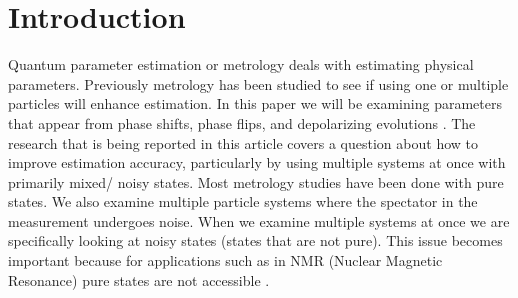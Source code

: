 \documentclass[twocolumn]{article}
\begin{document}
\section*{Introduction}
Quantum parameter estimation or metrology deals with estimating physical parameters. Previously metrology has been studied to see if using one or multiple particles will enhance estimation. In this paper we will be examining parameters that appear from phase shifts, phase flips, and depolarizing evolutions \cite{Braunstein,Caves,Helstrom,Sarovar}. The research that is being reported in this article covers a question about how to improve estimation accuracy, particularly by using multiple systems at once with primarily mixed/ noisy states. Most metrology studies have been done with pure states. We also examine multiple particle systems where the spectator in the measurement undergoes noise. When we examine multiple systems at once we are specifically looking at noisy states (states that are not pure). This issue becomes important because for applications such as in NMR (Nuclear Magnetic Resonance) pure states are not accessible \cite{D. Collins}.
\end{document}
